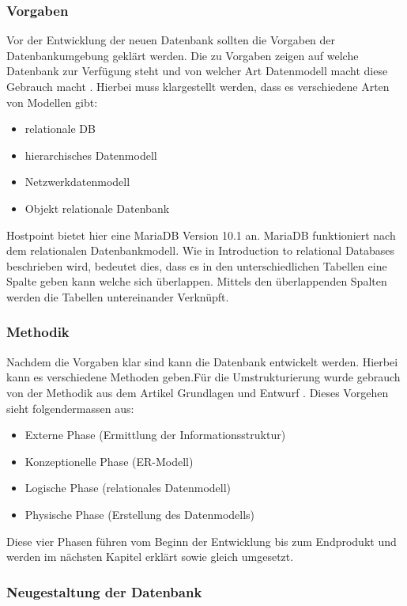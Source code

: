 \subsubsection{Vorgaben}
Vor der Entwicklung der neuen Datenbank sollten die Vorgaben der Datenbankumgebung geklärt werden. Die zu Vorgaben zeigen auf welche Datenbank zur Verfügung steht und von welcher Art Datenmodell macht diese Gebrauch macht . Hierbei muss klargestellt werden, dass es verschiedene Arten von Modellen gibt:
\begin{itemize}
\item relationale DB
\item hierarchisches Datenmodell
\item Netzwerkdatenmodell
\item Objekt relationale Datenbank
\end{itemize}

Hostpoint bietet hier eine MariaDB Version 10.1 an. MariaDB funktioniert nach dem relationalen Datenbankmodell. Wie in Introduction to relational Databases \cite{IntroductionToRelationalDatabases:MariaDB} beschrieben wird, bedeutet dies, dass es in den unterschiedlichen Tabellen eine Spalte geben kann welche sich überlappen. Mittels den überlappenden Spalten werden die Tabellen untereinander Verknüpft.\\

\subsubsection{Methodik}
Nachdem die Vorgaben klar sind kann die Datenbank entwickelt werden. Hierbei kann es verschiedene Methoden geben.Für die Umstrukturierung wurde gebrauch von der Methodik aus dem Artikel Grundlagen und Entwurf \cite{Datenbanken:GrundlagenUndEntwurf:VeikkoKrypczyk}. Dieses Vorgehen sieht folgendermassen aus:
\begin{itemize}
\item Externe Phase (Ermittlung der Informationsstruktur)
\item Konzeptionelle Phase (ER-Modell)
\item Logische Phase (relationales Datenmodell)
\item Physische Phase (Erstellung des Datenmodells)
\end{itemize}

Diese vier Phasen führen vom Beginn der Entwicklung bis zum Endprodukt und werden im nächsten Kapitel erklärt sowie gleich umgesetzt.
\subsubsection{Neugestaltung der Datenbank}
